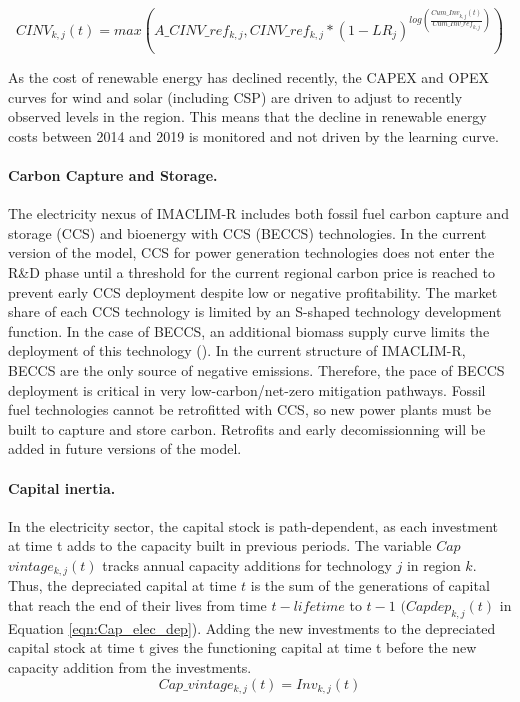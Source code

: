 \begin{dmath}
    CINV_{k,j}(t) = max(A\_CINV \_ ref_{k,j}, CINV\_ref_{k,j}*(1-LR_{j})^{log(\frac{Cum\_Inv_{k,j}(t)}{Cum\_Inv\_ ref_{k,j}})})
    \label{eqn:LR}
\end{dmath}

As the cost of renewable energy has declined recently, the CAPEX and OPEX curves for wind and solar (including CSP) are driven to adjust to recently observed levels in the region. This means that the decline in renewable energy costs between 2014 and 2019 is monitored and not driven by the learning curve.

\paragraph{Carbon Capture and Storage.}
The electricity nexus of IMACLIM-R includes both fossil fuel carbon capture and storage (CCS) and bioenergy with CCS (BECCS) technologies. In the current version of the model, CCS for power generation technologies does not enter the R\&D phase until a threshold for the current regional carbon price is reached to prevent early CCS deployment despite low or negative profitability. The market share of each CCS technology is limited by an S-shaped technology development function. In the case of BECCS, an additional biomass supply curve limits the deployment of this technology (\cite{Hoogwijk2009}). In the current structure of IMACLIM-R, BECCS are the only source of negative emissions. Therefore, the pace of BECCS deployment is critical in very low-carbon/net-zero mitigation pathways. Fossil fuel technologies cannot be retrofitted with CCS, so new power plants must be built to capture and store carbon. Retrofits and early decomissionning will be added in future versions of the model.


\paragraph{Capital inertia.}
In the electricity sector, the capital stock is path-dependent, as each investment at time t adds to the capacity built in previous periods. The variable $Cap$ \textunderscore $vintage_{k,j}(t)$ tracks annual capacity additions for technology $j$ in region $k$. Thus, the depreciated capital at time $t$ is the sum of the generations of capital that reach the end of their lives from time $t - lifetime$ to $t - 1$ $(Cap$\textunderscore$dep_{k,j}(t)$ in Equation \ref{eqn:Cap_elec_dep}). Adding the new investments to the depreciated capital stock at time t gives the functioning capital at time t before the new capacity addition from the investments.
\begin{dmath}
    Cap\_vintage_{k,j}(t) = Inv_{k,j}(t)
    \label{eqn:Cap_elec_vintage}
\end{dmath}


